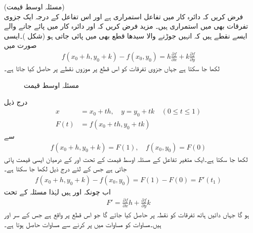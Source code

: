 \quad (مسئلہ اوسط قیمت)\\
فرض کریں کہ دائرہ کار  میں تفاعل  استمراری ہے اور اس تفاعل کے درجہ ایک جزوی تفرقات بھی  میں استمراری ہیں۔ مزید فرض کریں کہ  اور   دائرہ کار  میں پائے جانے والے ایسے نقطے ہیں کہ انہیں جوڑنے والا سیدھا قطع  بھی  میں پائی جاتی ہو (شکل )۔ایسی صورت میں 
\begin{align}\label{مساوات_الاحصاء_مسئلہ_زنجیری_الف}
f(x_0+h,y_0+k)-f(x_0,y_0)=h\frac{\partial f}{\partial x}+k\frac{\partial f}{\partial y}
\end{align}
لکھا جا سکتا ہے جہاں جزوی تفرقات کو  اس قطع پر موزوں نقطے پر حاصل کیا جاتا ہے۔
\begin{figure}
\centering
{}
\caption{مسئلہ اوسط قیمت}
\label{شکل_مسئلہ_الاحصاء_اوسط_قیمت}
\end{figure}
درج ذیل
\begin{align*}
x&=x_0+th,\quad y=y_0+tk\quad (0\le t \le 1)\\
F(t)&=f(x_0+th,y_0+tk)
\end{align*}
سے
\begin{align*}
f(x_0+h,y_0+k)=F(1),\quad f(x_0,y_0)=F(0)
\end{align*}
لکھا جا سکتا ہے۔ایک متغیر تفاعل کے  مسئلہ اوسط قیمت کے تحت  اور  کے درمیان  ایسی قیمت   پائی جاتی ہے جس کے لئے  درج ذیل لکھا جا سکتا ہے۔ 
\begin{align}\label{مساوات_الاحصاء_مسئلہ_زنجیری_ب}
f(x_0+h,y_0+k)-f(x_0,y_0)=F(1)-F(0)=F'(t_1)
\end{align}
اب چونکہ  اور  ہیں لہٰذا مسئلہ  کے تحت
\begin{align}\label{مساوات_الاحصاء_مسئلہ_زنجیری_پ}
F'=\frac{\partial f}{\partial x}h+\frac{\partial f}{\partial y}k
\end{align}
ہو گا جہاں دائیں ہاتھ تفرقات کو نقطہ  پر حاصل کیا جائے گا جو اس قطع پر واقع ہے جس کے سر  اور  ہیں۔مساوات  کو مساوات  میں پر کرنے سے  مساوات  حاصل ہوتا ہے۔

